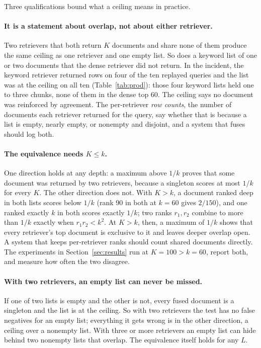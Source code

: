 \documentclass[11pt]{article}
\begin{document}
Three qualifications bound what a ceiling means in practice.

\paragraph{It is a statement about overlap, not about either retriever.} Two retrievers that both return $K$ documents and share none of them produce the same ceiling as one retriever and one empty list. So does a keyword list of one or two documents that the dense retriever did not return. In the incident, the keyword retriever returned rows on four of the ten replayed queries and the list was at the ceiling on all ten (Table~\ref{tab:prod}): those four keyword lists held one to three chunks, none of them in the dense top 60. The ceiling says no document was reinforced by agreement. The per-retriever \emph{row counts}, the number of documents each retriever returned for the query, say whether that is because a list is empty, nearly empty, or nonempty and disjoint, and a system that fuses should log both.

\paragraph{The equivalence needs $K \le k$.} One direction holds at any depth: a maximum above $1/k$ proves that some document was returned by two retrievers, because a singleton scores at most $1/k$ for every $K$. The other direction does not. With $K > k$, a document ranked deep in both lists scores below $1/k$ (rank 90 in both at $k = 60$ gives $2/150$), and one ranked exactly $k$ in both scores exactly $1/k$; two ranks $r_1, r_2$ combine to more than $1/k$ exactly when $r_1 r_2 < k^2$. At $K > k$, then, a maximum of $1/k$ shows that every retriever's top document is exclusive to it and leaves deeper overlap open. A system that keeps per-retriever ranks should count shared documents directly. The experiments in Section~\ref{sec:results} run at $K = 100 > k = 60$, report both, and measure how often the two disagree.

\paragraph{With two retrievers, an empty list can never be missed.} If one of two lists is empty and the other is not, every fused document is a singleton and the list is at the ceiling. So with two retrievers the test has no false negatives for an empty list; everything it gets wrong is in the other direction, a ceiling over a nonempty list. With three or more retrievers an empty list can hide behind two nonempty lists that overlap. The equivalence itself holds for any $L$.
\end{document}
